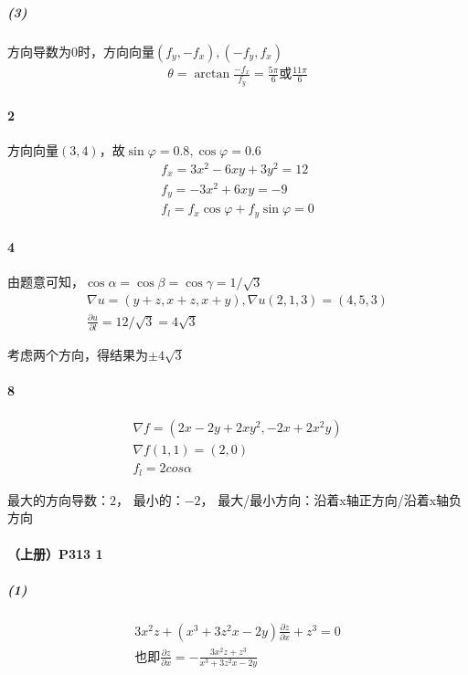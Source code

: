 \documentclass[UTF8]{ctexart}
\begin{document}
    \subparagraph*{(3)}
    方向导数为0时，方向向量$(f_y, -f_x),(-f_y, f_x)$
    \begin{align*}
        \theta = \arctan \frac{-f_x}{f_y} = \frac{5\pi}{6}\text{或}\frac{11\pi}{6} 
    \end{align*}

    \paragraph*{2}

    
    方向向量$(3,4)$，故$\sin \varphi = 0.8, \cos \varphi = 0.6$
    \begin{align*}
        f_x = 3x^2 - 6xy + 3y^2 = 12 \\
        f_y = -3x^2 + 6xy = -9 \\
        f_l = f_x \cos \varphi + f_y \sin \varphi = 0
    \end{align*}

    \paragraph*{4}
    由题意可知，$\cos \alpha = \cos \beta = \cos \gamma = 1/\sqrt{3} $
    \begin{align*}
        \nabla u = (y+z, x+z, x+y), \nabla u(2,1,3) = (4, 5, 3) \\
        \frac{\partial u}{\partial l} = 12 / \sqrt{3} = 4\sqrt{3}
    \end{align*}

    考虑两个方向，得结果为$\pm 4\sqrt{3}$

    \paragraph*{8}
    \begin{align*}
        \nabla f = (2x-2y+2xy^2, -2x+2x^2y) \\
        \nabla f(1,1) = (2, 0) \\
        f_l = 2cos\alpha
    \end{align*}

    最大的方向导数：$2$， 最小的：$-2$， 最大/最小方向：沿着x轴正方向/沿着x轴负方向

    \paragraph*{（上册）P313 1}
    \subparagraph*{(1)}
    \begin{align*}
        3x^2z + (x^3+3z^2x-2y) 
        \frac{\partial z}{\partial x} +z^3 = 0 \\
        \text{也即} \frac{\partial z}{\partial x} = 
        -\frac{3x^2z+z^3}{x^3+3z^2x-2y} 
    \end{align*}
\end{document}
